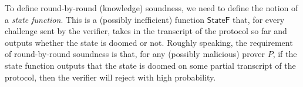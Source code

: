 To define round-by-round (knowledge) soundness, we need to define the notion of a \emph{state function}. This is a (possibly inefficient) function $\mathsf{StateF}$ that, for every challenge sent by the verifier, takes in the transcript of the protocol so far and outputs whether the state is doomed or not. Roughly speaking, the requirement of round-by-round soundness is that, for any (possibly malicious) prover $P$, if the state function outputs that the state is doomed on some partial transcript of the protocol, then the verifier will reject with high probability.

\begin{definition}
    \label{def:state_function}
\end{definition}

\begin{definition}
    \label{def:round_by_round_soundness}
\end{definition}

\begin{definition}
    \label{def:round_by_round_knowledge_soundness}
\end{definition}